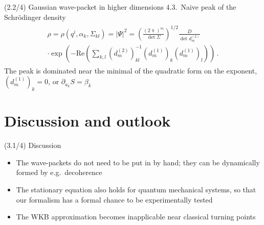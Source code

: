 \documentclass[mathserif]{beamer}
\newcommand{\rbr}[1]{{\left(#1\right)}}
\newcommand{\vbr}[1]{{\left|#1\right|}}
\newcommand{\rfun}[2]{#1\mathopen{}\left(#2\right)\mathclose{}}
\begin{document}
\begin{frame}{(2.2/4) Gaussian wave-packet in higher dimensions}%
{4.3.\ Naive peak of the Schr\"odinger density}
\begin{align}
    \begin{split}
    \rho = \rfun{\rho}{q^i, \alpha_k, \varSigma_{kl}} = \vbr{\varPsi}^2 
    =
    \rbr{\frac{\rbr{2\uppi}^{m}}{\det \varSigma}}^{1/2} \frac{D}{\det d^{(2)}_m}
    \\
    \cdot \rfun{\exp}{-\rfun{\mathrm{Re}}{\sum_{k,l} \rbr{d^{(2)}_m}^{-1}_{kl} \rbr{d^{(1)}_m}_{k} \rbr{d^{(1)}_m}_{l}}}\,. 
    \end{split}
\end{align}
The peak is dominated near the minimal of the quadratic form on the exponent, $\rbr{d_m^{(1)}}_{k} = 0$, or $\partial_{a_k}S = \beta_k$
\end{frame}

\section{Discussion and outlook}


\begin{frame}{(3.1/4) Discussion}
    \begin{itemize}
        \item
        The wave-packets do not need to be put in by hand; they can be 
        dynamically formed by e.g.\ decoherence
        \item
        The stationary equation also holds for quantum mechanical systems, so 
        that our formalism has a formal chance to be experimentally tested
        \item
        The WKB approximation becomes inapplicable near classical 
        turning points
    \end{itemize}
\end{frame}
\end{document}
